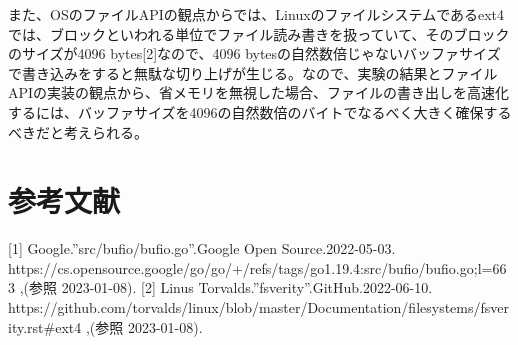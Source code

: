 \documentclass[
  12pt,
  a4j]{ltjarticle}
\begin{document}
また、OSのファイルAPIの観点からでは、Linuxのファイルシステムであるext4では、ブロックといわれる単位でファイル読み書きを扱っていて、そのブロックのサイズが4096
bytes{[}2{]}なので、4096
bytesの自然数倍じゃないバッファサイズで書き込みをすると無駄な切り上げが生じる。なので、実験の結果とファイルAPIの実装の観点から、省メモリを無視した場合、ファイルの書き出しを高速化するには、バッファサイズを4096の自然数倍のバイトでなるべく大きく確保するべきだと考えられる。

\hypertarget{ux53c2ux8003ux6587ux732e}{%
\section{参考文献}\label{ux53c2ux8003ux6587ux732e}}

{[}1{]} Google.''src/bufio/bufio.go''.Google Open Source.2022-05-03.
https://cs.opensource.google/go/go/+/refs/tags/go1.19.4:src/bufio/bufio.go;l=663
,(参照 2023-01-08). {[}2{]} Linus
Torvalds.''fsverity''.GitHub.2022-06-10.
https://github.com/torvalds/linux/blob/master/Documentation/filesystems/fsverity.rst\#ext4
,(参照 2023-01-08).
\end{document}
